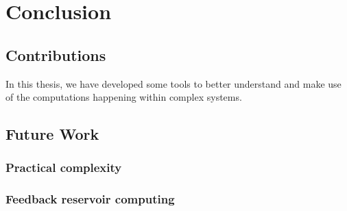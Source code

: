 \chapter{Conclusion}

%
\section{Contributions}

In this thesis, we have developed some tools to better understand and make use
of the computations happening within complex systems.

\section{Future Work}

\subsection{Practical complexity}

\subsection{Feedback reservoir computing}

